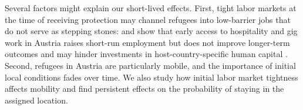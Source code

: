 Several factors might explain our short-lived effects. First, tight labor markets at the time of receiving protection may channel refugees into low-barrier jobs that do not serve as stepping stones: \citet{degenhardt2025initial} and \citet{degenhardt2025} show that early access to hospitality and gig work in Austria raises short-run employment but does not improve longer-term outcomes and may hinder investments in host-country-specific human capital \citep{battisti_dynamic_2022}. Second, refugees in Austria are particularly mobile, and the importance of initial local conditions fades over time. We also study how initial labor market tightness affects mobility and find persistent effects on the probability of staying in the assigned location. 


